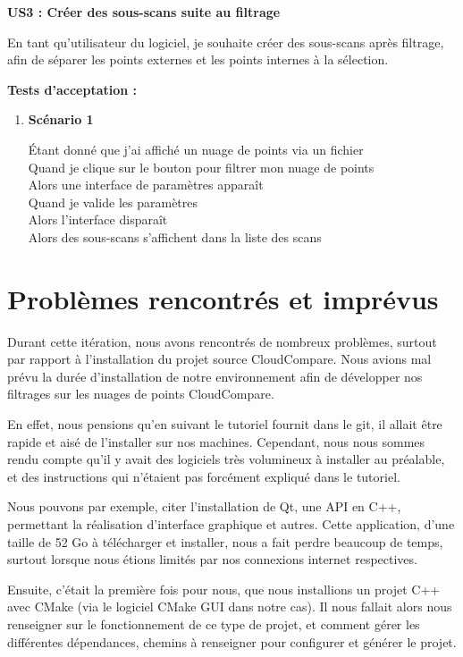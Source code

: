 \documentclass[12pt,titlepage,french]{article}
\begin{document}
\textbf{\og US3 : Créer des sous-scans suite au filtrage\fg{}}

En tant qu'utilisateur du logiciel, je souhaite créer des sous-scans après filtrage, afin de séparer les points externes et les points internes à la sélection.

\textbf{Tests d'acceptation :}
\begin{enumerate}

    \item \textbf{Scénario 1}

Étant donné que j'ai affiché un nuage de points via un fichier\\
Quand je clique sur le bouton pour filtrer mon nuage de points\\
Alors une interface de paramètres apparaît\\
Quand je valide les paramètres\\
Alors l'interface disparaît\\
Alors des sous-scans s'affichent dans la liste des scans
\end{enumerate}

\section{Problèmes rencontrés et imprévus \label{PB}}

Durant cette itération, nous avons rencontrés de nombreux problèmes, surtout par rapport à l'installation du projet source CloudCompare. Nous avions mal prévu la durée d'installation de notre environnement afin de développer nos filtrages sur les nuages de points CloudCompare.

En effet, nous pensions qu'en suivant le tutoriel fournit dans le git, il allait être rapide et aisé de l'installer sur nos machines. Cependant, nous nous sommes rendu compte qu'il y avait des logiciels très volumineux à installer au préalable, et des instructions qui n'étaient pas forcément expliqué dans le tutoriel.

Nous pouvons par exemple, citer l'installation de Qt, une API en C++, permettant la réalisation d'interface graphique et autres. Cette application, d'une taille de 52 Go à télécharger et installer, nous a fait perdre beaucoup de temps, surtout lorsque nous étions limités par nos connexions internet respectives.

Ensuite, c'était la première fois pour nous, que nous installions un projet C++ avec CMake (via le logiciel CMake GUI dans notre cas). Il nous fallait alors nous renseigner sur le fonctionnement de ce type de projet, et comment gérer les différentes dépendances, chemins à renseigner pour configurer et générer le projet.
\end{document}

